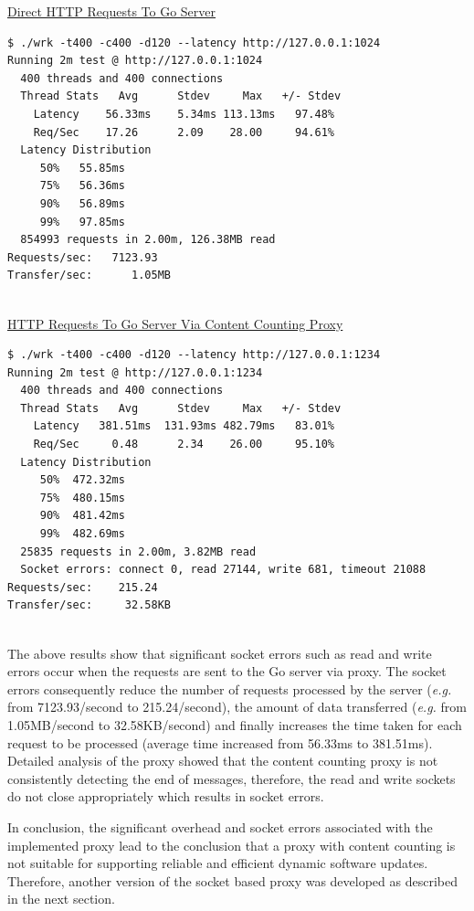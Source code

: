 \documentclass[a4paper,11pt,twoside]{article}
\begin{document}
\noindent
\underline{Direct HTTP Requests To Go Server}
\begin{lstlisting}[language=terminal]
$ ./wrk -t400 -c400 -d120 --latency http://127.0.0.1:1024
Running 2m test @ http://127.0.0.1:1024
  400 threads and 400 connections
  Thread Stats   Avg      Stdev     Max   +/- Stdev
    Latency    56.33ms    5.34ms 113.13ms   97.48%
    Req/Sec    17.26      2.09    28.00     94.61%
  Latency Distribution
     50%   55.85ms
     75%   56.36ms
     90%   56.89ms
     99%   97.85ms
  854993 requests in 2.00m, 126.38MB read
Requests/sec:   7123.93
Transfer/sec:      1.05MB
\end{lstlisting}

\noindent\\
\underline{HTTP Requests To Go Server Via Content Counting Proxy} 
\begin{lstlisting}[language=terminal]
$ ./wrk -t400 -c400 -d120 --latency http://127.0.0.1:1234
Running 2m test @ http://127.0.0.1:1234
  400 threads and 400 connections
  Thread Stats   Avg      Stdev     Max   +/- Stdev
    Latency   381.51ms  131.93ms 482.79ms   83.01%
    Req/Sec     0.48      2.34    26.00     95.10%
  Latency Distribution
     50%  472.32ms
     75%  480.15ms
     90%  481.42ms
     99%  482.69ms
  25835 requests in 2.00m, 3.82MB read
  Socket errors: connect 0, read 27144, write 681, timeout 21088
Requests/sec:    215.24
Transfer/sec:     32.58KB
\end{lstlisting}


\noindent \\
The above results show that significant socket errors such as read and write errors occur when the requests are sent to the Go server via proxy. The socket errors consequently reduce the number of requests processed by the server (\textit{e.g.} from 7123.93/second to  215.24/second), the amount of data transferred (\textit{e.g.} from 1.05MB/second to 32.58KB/second) and finally increases the time taken for each request to be processed (average time increased from 56.33ms to 381.51ms). Detailed analysis of the proxy showed that the content counting proxy is not consistently detecting the end of messages, therefore, the read and write sockets do not close appropriately which results in socket errors. 

In conclusion, the significant overhead and socket errors associated with the implemented proxy lead to the conclusion that a proxy with content counting is not suitable for supporting reliable and efficient dynamic software updates. Therefore, another version of the socket based proxy was developed as described in the next section.
\end{document}
